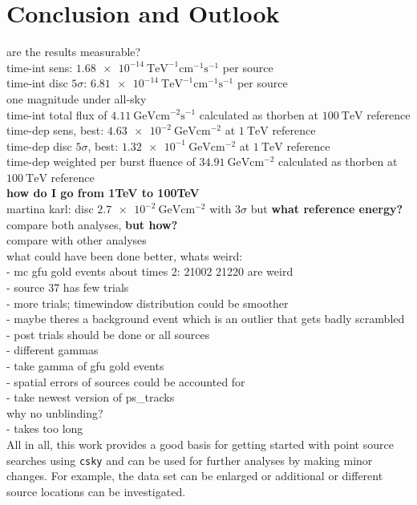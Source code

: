 \chapter{Conclusion and Outlook} \label{sec:outlook}
are the results measurable?\\
time-int sens: $\SI{1.68e-14}{\tera\electronvolt\tothe{-1}\centi\meter\tothe{-1}\second\tothe{-1}}$ per source\\
time-int disc $\num{5}\sigma$: $\SI{6.81e-14}{\tera\electronvolt\tothe{-1}\centi\meter\tothe{-1}\second\tothe{-1}}$ per source\\
one magnitude under all-sky\\
time-int total flux of $\SI{4.11}{\giga\electronvolt\centi\meter\tothe{-2}\second\tothe{-1}}$ calculated as thorben at $\SI{100}{\tera\electronvolt}$ reference\\
time-dep sens, best: $\SI{4.63e-2}{\giga\electronvolt\centi\meter\tothe{-2}}$ at $\SI{1}{\tera\electronvolt}$ reference\\
time-dep disc $\num{5}\sigma$, best: $\SI{1.32e-1}{\giga\electronvolt\centi\meter\tothe{-2}}$ at $\SI{1}{\tera\electronvolt}$ reference\\
time-dep weighted per burst fluence of $\SI{34.91}{\giga\electronvolt\centi\meter\tothe{-2}}$ calculated as thorben at $\SI{100}{\tera\electronvolt}$ reference\\
\textbf{how do I go from 1TeV to 100TeV}\\
martina karl: disc $\SI{2.7e-2}{\giga\electronvolt\centi\meter\tothe{-2}}$ with $\num{3}\sigma$ but \textbf{what reference energy?}\\
compare both analyses, \textbf{but how?}\\
compare with other analyses\\

what could have been done better, whats weird:\\
- mc gfu gold events about times 2: 21002 21220 are weird\\
- source 37 has few trials\\
- more trials; timewindow distribution could be smoother\\
- maybe theres a background event which is an outlier that gets badly scrambled\\
- post trials should be done or all sources\\
- different gammas\\
- take gamma of gfu gold events\\
- spatial errors of sources could be accounted for\\
- take newest version of ps\_tracks\\
why no unblinding?\\
- takes too long\\

All in all, this work provides a good basis for getting started with point source searches using \texttt{csky} and can be used for further analyses by making minor changes.
For example, the data set can be enlarged or additional or different source locations can be investigated.
